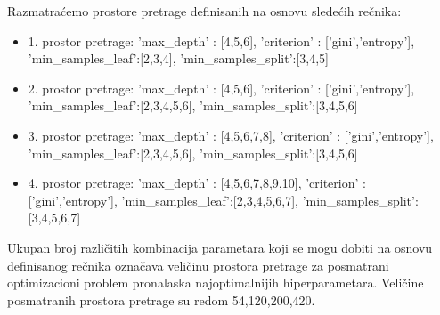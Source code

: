 \documentclass{article}
\begin{document}
\noindent Razmatraćemo prostore pretrage definisanih na osnovu sledećih rečnika:
\begin{itemize}
    \item 1. prostor pretrage: \newline
            'max\_depth' : [4,5,6], \newline
              'criterion' : ['gini','entropy'], \newline
              'min\_samples\_leaf':[2,3,4], \newline
              'min\_samples\_split':[3,4,5] 
    \item 2. prostor pretrage: \newline
            'max\_depth' : [4,5,6], \newline
              'criterion' : ['gini','entropy'], \newline
              'min\_samples\_leaf':[2,3,4,5,6], \newline
              'min\_samples\_split':[3,4,5,6]  
    \item 3. prostor pretrage: \newline
              'max\_depth' : [4,5,6,7,8], \newline
              'criterion' : ['gini','entropy'], \newline
              'min\_samples\_leaf':[2,3,4,5,6], \newline
              'min\_samples\_split':[3,4,5,6] 
    \item 4. prostor pretrage: \newline
              'max\_depth' : [4,5,6,7,8,9,10], \newline
              'criterion' : ['gini','entropy'], \newline
              'min\_samples\_leaf':[2,3,4,5,6,7], \newline
              'min\_samples\_split':[3,4,5,6,7]  \newline
\end{itemize}
Ukupan broj različitih kombinacija parametara koji se mogu dobiti na osnovu definisanog rečnika označava veličinu prostora pretrage za posmatrani optimizacioni problem pronalaska najoptimalnijih hiperparametara. Veličine posmatranih prostora pretrage su redom 54,120,200,420.\newline
\end{document}
